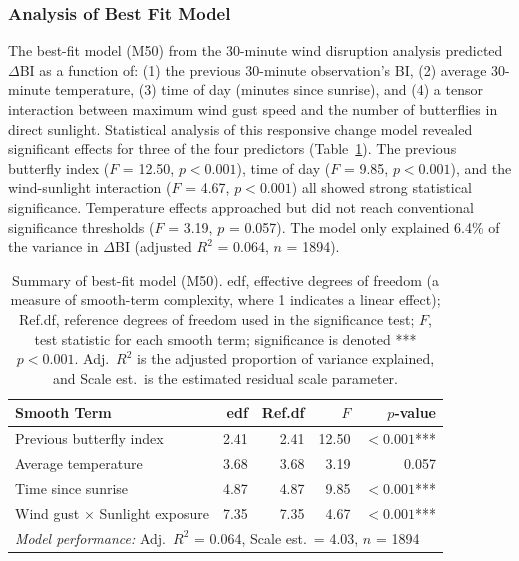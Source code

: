 \documentclass[insects,article,submit,pdftex,moreauthors]{Definitions/mdpi}
\begin{document}
\subsubsection{Analysis of Best Fit Model}

The best-fit model (M50) from the 30-minute wind disruption analysis predicted $\Delta$BI as a function of: (1) the previous 30-minute observation's BI, (2) average 30-minute temperature, (3) time of day (minutes since sunrise), and (4) a tensor interaction between maximum wind gust speed and the number of butterflies in direct sunlight. Statistical analysis of this responsive change model revealed significant effects for three of the four predictors (Table~\ref{tab:m50_summary}). The previous butterfly index ($F$ = 12.50, $p < 0.001$), time of day ($F$ = 9.85, $p < 0.001$), and the wind-sunlight interaction ($F$ = 4.67, $p < 0.001$) all showed strong statistical significance. Temperature effects approached but did not reach conventional significance thresholds ($F$ = 3.19, $p$ = 0.057). The model only explained 6.4\% of the variance in $\Delta$BI (adjusted $R^{2}$ = 0.064, $n$ = 1894).

\begin{table}[H]
\caption{Summary of best-fit model (M50). edf, effective degrees of freedom (a measure of smooth-term complexity, where 1 indicates a linear effect); Ref.df, reference degrees of freedom used in the significance test; $F$, test statistic for each smooth term; significance is denoted ***$p < 0.001$. Adj.\ $R^{2}$ is the adjusted proportion of variance explained, and Scale est.\ is the estimated residual scale parameter.}
\label{tab:m50_summary}
\centering
\small
\begin{tabular}{lrrrr}
\toprule
\textbf{Smooth Term} & \textbf{edf} & \textbf{Ref.df} & \textbf{$F$} & \textbf{$p$-value} \\
\midrule
Previous butterfly index & 2.41 & 2.41 & 12.50 & $< 0.001$*** \\
Average temperature & 3.68 & 3.68 & 3.19 & 0.057 \\
Time since sunrise & 4.87 & 4.87 & 9.85 & $< 0.001$*** \\
Wind gust $\times$ Sunlight exposure & 7.35 & 7.35 & 4.67 & $< 0.001$*** \\
\midrule
\multicolumn{5}{l}{\textit{Model performance:} Adj.\ $R^{2}$ = 0.064, Scale est.\ = 4.03, $n$ = 1894} \\
\bottomrule
\end{tabular}
\end{table}
\end{document}
